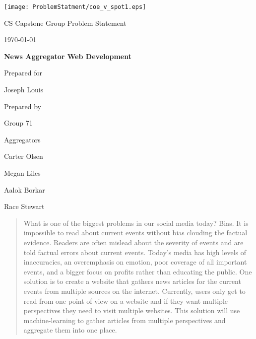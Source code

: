 \documentclass[onecolumn, draftclsnofoot,10pt, compsoc]{IEEEtran}
\def \CapstoneTeamName{Aggregators}
\def \CapstoneTeamNumber{71}
\def \GroupMemberOne{Carter Olsen}
\def \GroupMemberTwo{Megan Liles}
\def \GroupMemberThree{Aalok Borkar}
\def \GroupMemberFour{Race Stewart}
\def \CapstoneProjectName{News Aggregator Web Development}
\def \CapstoneSponsorPerson{Joseph Louis}
\def \DocType{		%
				Group Problem Statement
				}
\begin{document}
\begin{titlepage}
    \begin{singlespace}
    	\texttt{[image: ProblemStatment/coe\_v\_spot1.eps]}
        \hfill 
        \par\vspace{.2in}
        \centering
        \scshape{
            \huge CS Capstone \DocType \par
            {\large\today}\par
            \vspace{.5in}
            \textbf{\Huge\CapstoneProjectName}\par
            \vfill
            {\large Prepared for}\par
            \vspace{5pt}
            {\Large\CapstoneSponsorPerson\par}
            {\large Prepared by }\par
            Group \CapstoneTeamNumber\par
            \CapstoneTeamName\par 
            \vspace{5pt}
            {\Large
                \GroupMemberOne\par
                \GroupMemberTwo\par
                \GroupMemberThree\par
                \GroupMemberFour\par
            }
            \vspace{20pt}
        }
        \begin{abstract}
        	What is one of the biggest problems in our social media today?
        	Bias.
        	It is impossible to read about current events without bias clouding  the factual evidence. 
        	Readers are often mislead about the severity of events and are told factual errors about current events.
        	Today's media has high levels of inaccuracies, an overemphasis on emotion, poor coverage of all important events, and a bigger focus on profits rather than educating the public.
        	One solution is to create a website that gathers news articles for the current events from multiple sources on the internet.
        	Currently, users only get to read from one point of view on a website and if they want multiple perspectives they need to visit multiple websites.
        	This solution will use machine-learning to gather articles from multiple perspectives and aggregate them into one place.
        \end{abstract}     
    \end{singlespace}
\end{titlepage}
\newpage
{}
\tableofcontents
\clearpage
\end{document}
